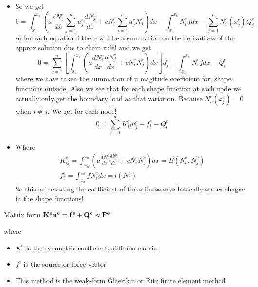 	\begin{frame}
		\begin{itemize}
			\item So we get
			\begin{equation}
				 0 = \int_{x_a}^{x_b} \left(a \frac{dN_i^e}{dx} \sum_{j=1}^{n} u_j^e\frac{dN_j^e}{dx} + cN_i^e\sum_{j=1}^{n}u_j^eN_j^e\right)dx - \int_{x_a}^{x_b} N_i^ef dx -  \sum_{j=1}^{n} N_i^e (x_j^e)Q_j^e
			\end{equation}
			so for each equation i there will be a summation on the derivatives of the approx solution due to chain rule! and we get
			\begin{equation}
				 0 = \sum_{j=1}^{n} \left[ \int_{x_a}^{x_b} \left(a \frac{dN_i^e}{dx}  \frac{dN_j^e}{dx} + cN_i^e N_j^e\right)dx\right]u_j^e - \int_{x_a}^{x_b} N_i^ef dx -  Q_i^e
			\end{equation}
			where we have taken the summation of u magitude coefficient for, shape functions  outside. Also we see that for each shape function at each node we actually only get the boundary load at that variation. Because $N_i^e(x^e_j) = 0$ when $i \neq j$. We get for each node!
			\begin{equation}
				0 = \sum_{j=1}^{n} K_{ij}^e u_j^e - f_i^e - Q_i^e
			\end{equation}
		\end{itemize}

	\end{frame}

	\begin{frame}
		\begin{itemize}
			\item Where
			\begin{equation}
			\begin{aligned}
				K_{ij}^e = \int_{x_a}^{x_b} \left(a \frac{dN_i^e}{dx}  \frac{dN_j^e}{dx} + cN_i^e N_j^e\right)dx  =  B(N_i^e,N_j^e)\\
				f_i^e = \int_{x_a}^{x_b} fN_i^e dx = l(N_i^e)
			\end{aligned}
			\end{equation}
			So this is ineresting the coefficient of the stifness says basically states chagne in the shape functions!
		\end{itemize}
		\begin{block}{Matrix form}
			\centering
			$\mathbf{K^eu^e = f^e + Q^e \approx F^e}$
		\end{block}
	where 
		\begin{itemize}
			\item $K^e$	is the symmetric coefficient, stiffness matrix
			\item $f^e$ is the source or force vector
			\item This method is the weak-form Glaerikin or Ritz finite element method
		\end{itemize}
	
	\end{frame}


